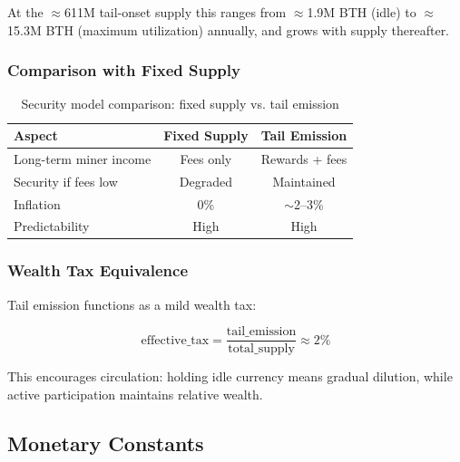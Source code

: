 At the $\approx$611M tail-onset supply this ranges from $\approx$1.9M BTH (idle)
to $\approx$15.3M BTH (maximum utilization) annually, and grows with supply
thereafter.

\subsubsection{Comparison with Fixed Supply}

\begin{table}[h]
\centering
\caption{Security model comparison: fixed supply vs. tail emission}
\label{tab:supply-security-comparison}
\begin{tabular}{@{}lcc@{}}
\toprule
\textbf{Aspect} & \textbf{Fixed Supply} & \textbf{Tail Emission} \\
\midrule
Long-term miner income & Fees only & Rewards + fees \\
Security if fees low & Degraded & Maintained \\
Inflation & 0\% & $\sim$2--3\% \\
Predictability & High & High \\
\bottomrule
\end{tabular}
\end{table}

\subsubsection{Wealth Tax Equivalence}

Tail emission functions as a mild wealth tax:

\begin{equation}
\text{effective\_tax} = \frac{\text{tail\_emission}}{\text{total\_supply}} \approx 2\%
\end{equation}

This encourages circulation: holding idle currency means gradual dilution,
while active participation maintains relative wealth.

\subsection{Monetary Constants}

